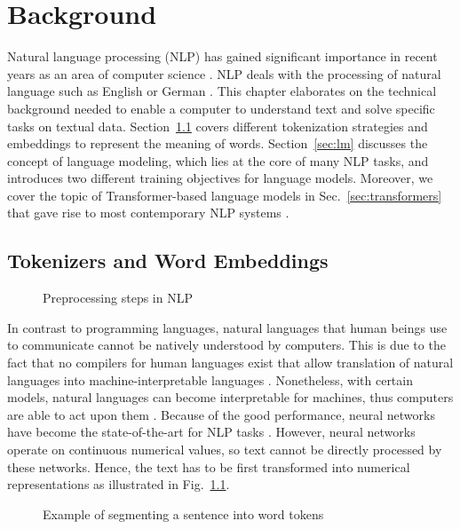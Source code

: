 \chapter{Background} \label{chap:background}

Natural language processing (NLP) has gained significant importance in recent
years as an area of computer science \cite{eisenstein2019intro2nlp}. NLP deals
with the processing of natural language such as English or German
\cite{hapke2019natural}. This chapter elaborates on the technical background
needed to enable a computer to understand text and solve specific tasks on
textual data. Section~\ref{sec:tokenizers} covers different tokenization
strategies and embeddings to represent the meaning of words.
Section~\ref{sec:lm} discusses the concept of language modeling, which lies at
the core of many NLP tasks, and introduces two different training objectives for
language models. Moreover, we cover the topic of Transformer-based language
models in Sec.~\ref{sec:transformers} that gave rise to most contemporary NLP
systems \cite{min2023recent}.

\section{Tokenizers and Word Embeddings} \label{sec:tokenizers}

\begin{figure}[htb]
    \centering
    \resizebox*{.8\textwidth}{!}{}
    \caption{Preprocessing steps in NLP}
    \label{fig:nlp_preprocess}
\end{figure}

In contrast to programming languages, natural languages that human beings use to
communicate cannot be natively understood by computers. This is due to the fact
that no compilers for human languages exist that allow translation of natural
languages into machine-interpretable languages \cite{hapke2019natural}.
Nonetheless, with certain models, natural languages can become interpretable for
machines, thus computers are able to act upon them \cite{hapke2019natural}.
Because of the good performance, neural networks have become the
state-of-the-art for NLP tasks \cite{otter2020survey}. However, neural networks
operate on continuous numerical values, so text cannot be directly processed by
these networks. Hence, the text has to be first transformed into numerical
representations as illustrated in Fig.~\ref{fig:nlp_preprocess}.

\begin{figure}[htb]
    \centering
    
    \caption{Example of segmenting a sentence into word tokens}
    \label{fig:tokenization}
\end{figure}

